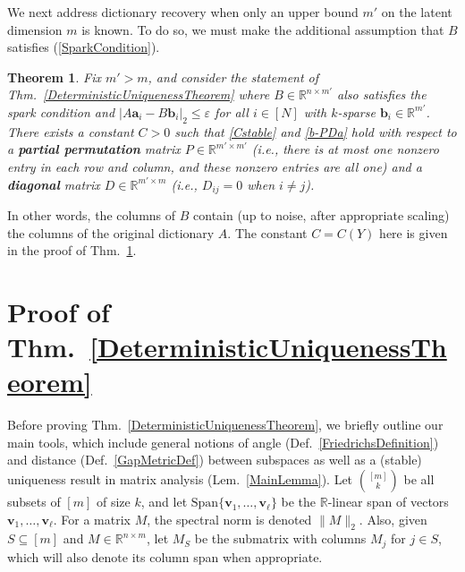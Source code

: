 \documentclass[journal, twocolumn]{IEEEtran}
\newtheorem{theorem}{Theorem}
\begin{document}
We next address dictionary recovery when only an upper bound $m'$ on the latent dimension $m$ is known. To do so, we must make the additional assumption that $B$ satisfies (\ref{SparkCondition}). 

\begin{theorem}\label{DeterministicUniquenessTheorem2}
Fix $m' > m$, and consider the statement of Thm.~\ref{DeterministicUniquenessTheorem} where $B \in \mathbb{R}^{n \times m'}$ also satisfies the spark condition and \mbox{$|A\mathbf{a}_i - B\mathbf{b}_i|_2 \leq \varepsilon$} for all $i \in [N]$ with $k$-sparse $\mathbf{b}_i \in \mathbb{R}^{m'}$.  There exists a constant $C > 0$ such that \eqref{Cstable} and \eqref{b-PDa} hold with respect to a \textbf{partial permutation} matrix $P \in \mathbb{R}^{m' \times m'}$ (i.e., there is at most one nonzero entry in each row and column, and these nonzero entries are all one) and a \textbf{diagonal} matrix $D \in \mathbb{R}^{m' \times m}$ (i.e., $D_{ij} = 0$ when $i \neq j$). 
\end{theorem}

In other words, the columns of $B$ contain (up to noise, after appropriate scaling) the columns of the original dictionary $A$. 
The constant \mbox{$C = C(Y)$} here is given in the proof of Thm.~\ref{DeterministicUniquenessTheorem2}. 


\section{Proof of Thm.~\ref{DeterministicUniquenessTheorem}}\label{DUT}
Before proving Thm.~\ref{DeterministicUniquenessTheorem}, we briefly outline our main tools, which include general notions of angle (Def.~\ref{FriedrichsDefinition}) and distance (Def.~\ref{GapMetricDef}) between subspaces as well as a (stable) uniqueness result in matrix analysis (Lem.~\ref{MainLemma}).
Let ${[m] \choose k}$ be all subsets of $[m]$ of size $k$, and let $\text{Span}\{\mathbf{v}_1, \ldots, \mathbf{v}_\ell\}$ be the $\mathbb{R}$-linear span of vectors $\mathbf{v}_1, \ldots, \mathbf{v}_\ell$.  For a matrix $M$, the spectral norm is denoted $\|M\|_2$.
Also, given $S \subseteq [m]$ and $M \in \mathbb{R}^{n \times m}$, let $M_S$ be the submatrix with columns $M_j$ for $j \in S$, which will also denote its column span when appropriate.  
\end{document}
